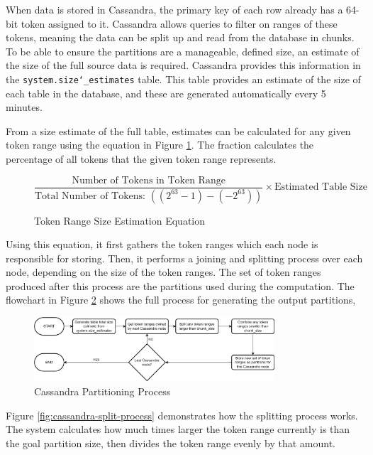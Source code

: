 When data is stored in Cassandra, the primary key of each row already has a 64-bit token assigned to it. Cassandra allows queries to filter on ranges of these tokens, meaning the data can be split up and read from the database in chunks. To be able to ensure the partitions are a manageable, defined size, an estimate of the size of the full source data is required. Cassandra provides this information in the \texttt{system.size\char`_estimates} table. This table provides an estimate of the size of each table in the database, and these are generated automatically every 5 minutes.

From a size estimate of the full table, estimates can be calculated for any given token range using the equation in Figure \ref{fig:token-range-estimation}. The fraction calculates the percentage of all tokens that the given token range represents.

\begin{figure}[h]
	\centering
	\[ \frac{\text{Number of Tokens in Token Range}}{\text{Total Number of Tokens: } ((2^{63}-1) - (-2^{63}))} \times \text{Estimated Table Size} \]
	\caption{Token Range Size Estimation Equation}
	\label{fig:token-range-estimation}
\end{figure}

Using this equation, it first gathers the token ranges which each node is responsible for storing. Then, it performs a joining and splitting process over each node, depending on the size of the token ranges. The set of token ranges produced after this process are the partitions used during the computation. The flowchart in Figure \ref{fig:cassandra-partitioning-decision-tree} shows the full process for generating the output partitions, 

\begin{figure}[h]
	\centering
	\includegraphics[width=0.8\textwidth]{chapters/diagrams/implementation/cassandra-partitioning-decision-tree}
	\caption{Cassandra Partitioning Process}
	\label{fig:cassandra-partitioning-decision-tree}
\end{figure}


Figure \ref{fig:cassandra-split-process} demonstrates how the splitting process works. The system calculates how much times larger the token range currently is than the goal partition size, then divides the token range evenly by that amount.

